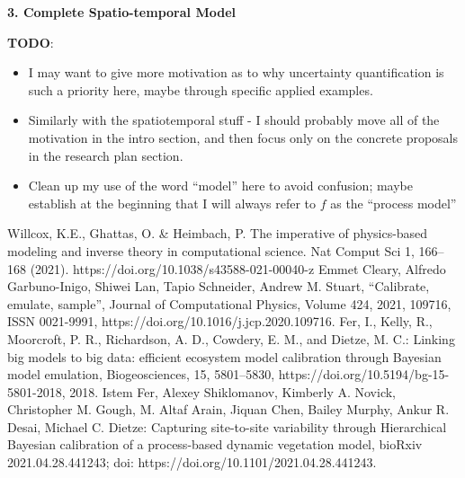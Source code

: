 \documentclass[12pt]{article}
\begin{document}
  \textbf{3. Complete Spatio-temporal Model}
  
 
 
 

 
 \textbf{TODO}:
 \begin{itemize}
 \item I may want to give more motivation as to why uncertainty quantification is such a priority here, maybe through specific applied examples. 
 \item Similarly with the spatiotemporal stuff - I should probably move all of the motivation in the intro section, and then focus only on the concrete proposals in the research plan section. 
 \item Clean up my use of the word ``model'' here to avoid confusion; maybe establish at the beginning that I will always refer to $f$ as the ``process model''
 \end{itemize}



\begin{thebibliography}{20}
 Willcox, K.E., Ghattas, O. \& Heimbach, P. The imperative of physics-based modeling and inverse theory in computational science. Nat Comput Sci 1, 166–168 (2021). https://doi.org/10.1038/s43588-021-00040-z
 Emmet Cleary, Alfredo Garbuno-Inigo, Shiwei Lan, Tapio Schneider, Andrew M. Stuart, “Calibrate, emulate, sample”, Journal of Computational Physics, Volume 424, 2021, 109716, ISSN 0021-9991, https://doi.org/10.1016/j.jcp.2020.109716.
 Fer, I., Kelly, R., Moorcroft, P. R., Richardson, A. D., Cowdery, E. M., and Dietze, M. C.: Linking big models to big data: efficient ecosystem model calibration through Bayesian model emulation, Biogeosciences, 15, 5801–5830, https://doi.org/10.5194/bg-15-5801-2018, 2018.
 Istem Fer, Alexey Shiklomanov, Kimberly A. Novick, Christopher M. Gough, M. Altaf Arain, Jiquan Chen, Bailey Murphy, Ankur R. Desai, Michael C. Dietze: Capturing site-to-site variability through Hierarchical Bayesian calibration of a process-based dynamic vegetation model, bioRxiv 2021.04.28.441243; doi: https://doi.org/10.1101/2021.04.28.441243. 

\end{thebibliography}
\end{document}
